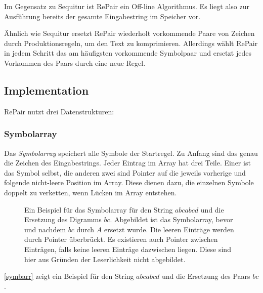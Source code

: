Im Gegensatz zu Sequitur ist RePair \cite{larsson_off-line_2000} ein Off-line Algorithmus. Es liegt also zur Ausführung bereits der gesamte Eingabestring im Speicher vor.

Ähnlich wie Sequitur ersetzt RePair wiederholt vorkommende Paare von Zeichen durch Produktionsregeln, um den Text zu komprimieren. Allerdings wählt RePair in jedem Schritt das am häufigsten vorkommende Symbolpaar und ersetzt jedes Vorkommen des Paars durch eine neue Regel.

\subsection{Implementation}

RePair nutzt drei Datenstrukturen:

\subsubsection{Symbolarray}

Das \emph{Symbolarray} speichert alle Symbole der Startregel. Zu Anfang sind das genau die Zeichen des Eingabestrings. Jeder Eintrag im Array hat drei Teile. Einer ist das Symbol selbst, die anderen zwei sind Pointer auf die jeweils vorherige und folgende nicht-leere Position im Array. Diese dienen dazu, die einzelnen Symbole doppelt zu verketten, wenn Lücken im Array entstehen.
\begin{figure}
	\centering
	\caption{Ein Beispiel für das Symbolarray für den String $abcabcd$ und die Ersetzung des Digramms $bc$. Abgebildet ist das Symbolarray, bevor und nachdem $bc$ durch $A$ ersetzt wurde. Die leeren Einträge werden durch Pointer überbrückt. Es existieren auch Pointer zwischen Einträgen, falls keine leeren Einträge dazwischen liegen. Diese sind hier aus Gründen der Leserlichkeit nicht abgebildet.}
    \label{symbarr}
\end{figure}
\autoref{symbarr} zeigt ein Beispiel für den String $abcabcd$ und die Ersetzung des Paars $bc$.

